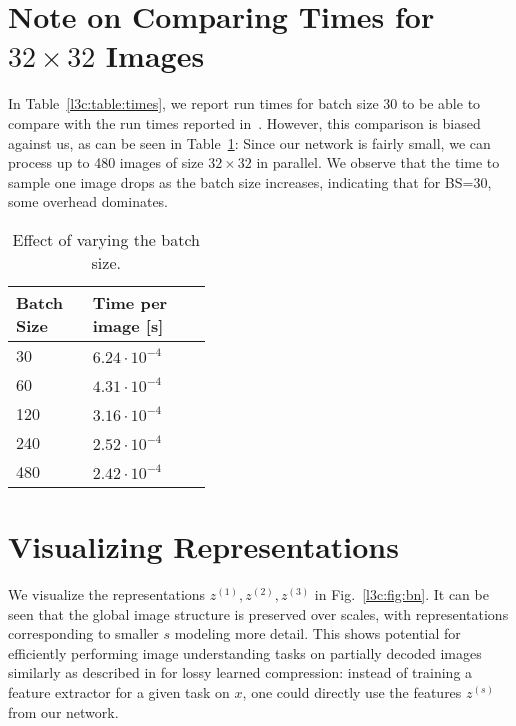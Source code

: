 \begin{subappendices}
\section{Note on Comparing Times for $32 \times 32$ Images} \label{l3c:sec:note_pcnn_cmp}
In Table~\ref{l3c:table:times}, we report run times for batch size 30 to be able to compare with the run times reported in~\cite{reed2017parallel}. However, this comparison is biased against us, as can be seen in Table~\ref{l3c:table:batchsize_32}: Since our network is fairly small, we can process up to 480 images of size $32{\times}32$ in parallel. We observe that the time to sample one image drops as the batch size increases, indicating that for BS=30, some overhead dominates.

\begin{table}[h!]
    \centering
    \begin{tabular}{p{0.39\linewidth}l}
        \toprule
        Batch Size & Time per image [s] \\
        \midrule
        30 & $6.24\cdot10^{-4}$ \\
        60 & $4.31\cdot10^{-4}$ \\
        120 & $3.16\cdot10^{-4}$ \\
        240 & $2.52\cdot10^{-4}$ \\
        480 & $2.42\cdot10^{-4}$ \\
        \bottomrule
    \end{tabular}
    \captionsetup{width=.8\linewidth}
    \caption{\label{l3c:table:batchsize_32}Effect of varying the batch size.\hfill}
\end{table}



\clearpage


\section{Visualizing Representations} \label{l3c:sec:visualize_repr}

We visualize the representations $z^{(1)}, z^{(2)}, z^{(3)}$ in Fig.~\ref{l3c:fig:bn}. It can be seen that the global image structure is preserved over scales, with representations corresponding to smaller $s$ modeling more detail. This shows potential for efficiently performing image understanding tasks on partially decoded images similarly as described in \cite{torfason2018towards} for lossy learned compression: instead of training a feature extractor for a given task on $x$, one could directly use the features $z^{(s)}$ from our network.


\end{subappendices}
